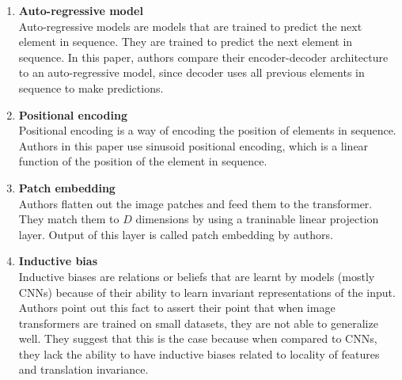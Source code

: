 \documentclass{article}
\begin{document}
\begin{enumerate}
    \item \textbf{Auto-regressive model} \\
           Auto-regressive models are models that are trained to predict the next element in sequence. They are trained to predict the next element in sequence. In this paper, authors compare their encoder-decoder architecture to an auto-regressive model, since decoder uses all previous elements in sequence to make predictions.

    \item \textbf{Positional encoding} \\
           Positional encoding is a way of encoding the position of elements in sequence. Authors in this paper use sinusoid positional encoding, which is a linear function of the position of the element in sequence.

    \item \textbf{Patch embedding} \\
           Authors flatten out the image patches and feed them to the transformer. They match them to $D$ dimensions by using a traninable linear projection layer. Output of this layer is called patch embedding by authors.

    \item \textbf{Inductive bias} \\
            Inductive biases are relations or beliefs that are learnt by models (mostly CNNs) because of their ability to learn invariant representations of the input. Authors point out this fact to assert their point that when image transformers are trained on small datasets, they are not able to generalize well. They suggest that this is the case because when compared to CNNs, they lack the ability to have inductive biases related to locality of features and translation invariance.

\end{enumerate}





\begin{enumerate}
\end{enumerate}
\end{document}
